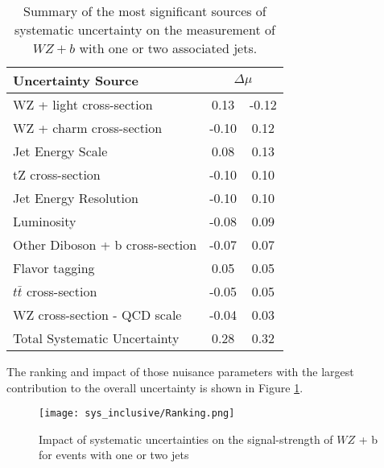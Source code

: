 \begin{table}[H]
    \centering
    \begin{tabular}{l|cc}
        \hline\hline
        Uncertainty Source & \multicolumn{2}{c}{$\Delta \mu$ }  \\
        \hline
        WZ + light cross-section & 0.13 & -0.12 \\
        WZ + charm cross-section & -0.10 & 0.12 \\
        Jet Energy Scale & 0.08 & 0.13 \\
        tZ cross-section & -0.10 & 0.10 \\
        Jet Energy Resolution & -0.10 & 0.10 \\
        Luminosity & -0.08 & 0.09 \\
        Other Diboson + b cross-section & -0.07 & 0.07 \\
        Flavor tagging & 0.05 & 0.05 \\
        $t\bar{t}$ cross-section & -0.05 & 0.05 \\
        WZ cross-section - QCD scale & -0.04 & 0.03 \\
        \hline
        Total Systematic Uncertainty & 0.28 & 0.32 \\
        
        \hline\hline
    \end{tabular}
    \caption{Summary of the most significant sources of systematic uncertainty on the measurement of $WZ+b$ with one or two associated jets.}
    \label{tab:systematics_inc}
\end{table}

The ranking and impact of those nuisance parameters with the largest contribution to the overall uncertainty is shown in Figure \ref{fig:ranking_inc}.

\begin{figure}[H]
    \centering
    \texttt{[image: sys\_inclusive/Ranking.png]}
    \caption{Impact of systematic uncertainties on the signal-strength of $WZ$ + b for events with one or two jets}
    \label{fig:ranking_inc}
\end{figure}


